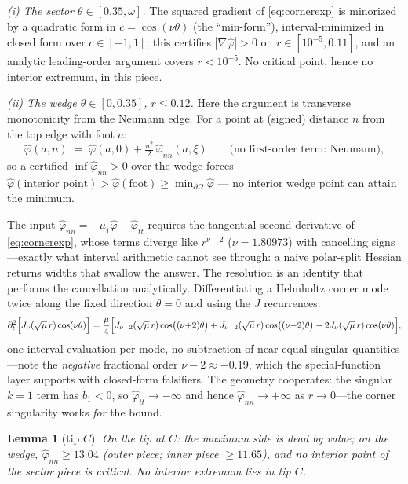 \documentclass[11pt]{article}
\newtheorem{lemma}{Lemma}
\newcommand{\phih}{\hat\varphi}
\begin{document}
\emph{(i) The sector $\theta\in[0.35,\omega]$.} The squared gradient of
\eqref{eq:cornerexp} is minorized by a quadratic form in
$c=\cos(\nu\theta)$ (the ``min-form''), interval-minimized in closed
form over $c\in[-1,1]$; this certifies $|\nabla\phih|>0$ on
$r\in[10^{-5},0.11]$, and an analytic leading-order argument covers
$r<10^{-5}$. No critical point, hence no interior extremum, in this
piece.

\emph{(ii) The wedge $\theta\in[0,0.35]$, $r\le0.12$.} Here the
argument is transverse monotonicity from the Neumann edge. For a point
at (signed) distance $n$ from the top edge with foot $a$:
\[
\phih(a,n)\;=\;\phih(a,0)+\tfrac{n^2}{2}\,\phih_{nn}(a,\xi)
\qquad\text{(no first-order term: Neumann)},
\]
so a certified $\inf\phih_{nn}>0$ over the wedge forces
$\phih(\text{interior point})>\phih(\text{foot})\ge\min_{\partial\Omega}\phih$
--- no interior wedge point can attain the minimum.

The input $\phih_{nn}=-\mu_1\phih-\phih_{tt}$ requires the tangential
second derivative of \eqref{eq:cornerexp}, whose terms diverge like
$r^{\nu-2}$ ($\nu=1.80973$) with cancelling signs---exactly what
interval arithmetic cannot see through: a naive polar-split Hessian
returns widths that swallow the answer. The resolution is an identity
that performs the cancellation analytically. Differentiating a
Helmholtz corner mode twice along the fixed direction $\theta=0$ and
using the $J$ recurrences:
\begin{equation}\label{eq:ladder}
\partial_t^2\Bigl[J_{\nu}(\sqrt{\mu}\,r)\cos(\nu\theta)\Bigr]
=\frac{\mu}{4}\Bigl[
J_{\nu+2}(\sqrt{\mu}\,r)\cos\bigl((\nu{+}2)\theta\bigr)
+J_{\nu-2}(\sqrt{\mu}\,r)\cos\bigl((\nu{-}2)\theta\bigr)
-2J_{\nu}(\sqrt{\mu}\,r)\cos(\nu\theta)\Bigr],
\end{equation}
one interval evaluation per mode, no subtraction of near-equal singular
quantities---note the \emph{negative} fractional order $\nu-2\approx
-0.19$, which the special-function layer supports with closed-form
falsifiers. The geometry cooperates: the singular $k{=}1$ term has
$b_1<0$, so $\phih_{tt}\to-\infty$ and hence $\phih_{nn}\to+\infty$ as
$r\to0$---the corner singularity works \emph{for} the bound.

\begin{lemma}[tip $C$]\label{lem:tipC}
On the tip at $C$: the maximum side is dead by value; on the wedge,
$\phih_{nn}\ge13.04$ (outer piece; inner piece $\ge11.65$), and no
interior point of the sector piece is critical. No interior extremum
lies in tip $C$.
\end{lemma}
\end{document}
